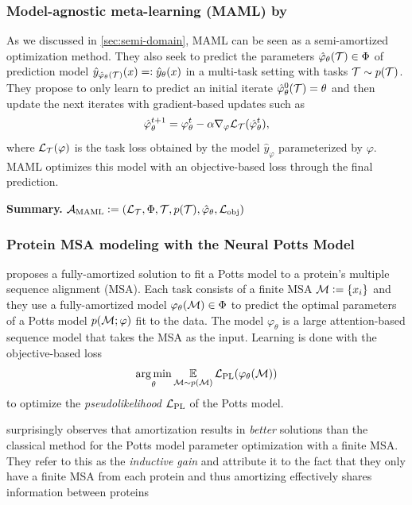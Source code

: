 \documentclass[twoside,11pt]{article}
\begin{document}
\subsubsection{Model-agnostic meta-learning (MAML) by \citet{finn2017model}}
As we discussed in \cref{sec:semi-domain},
MAML can be seen as a semi-amortized optimization method.
They also seek to predict the parameters
$\hat \varphi_\theta({\mathcal{T}})\in\Phi$
of prediction model $\hat y_{\hat \varphi_\theta({\mathcal{T}})}(x)=\vcentcolon \hat y_\theta(x)$
in a multi-task setting with tasks ${\mathcal{T}}\sim p({\mathcal{T}})$.
They propose to only learn to predict
an initial iterate $\hat \varphi^0_\theta({\mathcal{T}})=\theta$ and then
update the next iterates with gradient-based updates such as
\begin{equation}
  \hat \varphi^{t+1}_\theta = \varphi^t_\theta - \alpha\nabla_\varphi {\mathcal{L}}_{\mathcal{T}}(\hat \varphi^t_\theta),
  \label{eq:MAML-model}
\end{equation}
where ${\mathcal{L}}_{\mathcal{T}}(\varphi)$ is the task loss obtained by
the model $\hat y_\varphi$ parameterized by $\varphi$.
MAML optimizes this model with an objective-based
loss through the final prediction.

\textbf{Summary.}
${\mathcal{A}}_{\rm MAML}\vcentcolon=({\mathcal{L}}_{\mathcal{T}}, \Phi, {\mathcal{T}}, p({\mathcal{T}}), \hat \varphi_\theta, {\mathcal{L}}_{\rm obj})$

\subsubsection{Protein MSA modeling with the Neural Potts Model}
\label{sec:apps:potts}
\citet{sercu2021neural} proposes a fully-amortized solution to
fit a Potts model to a protein's multiple sequence alignment (MSA).
Each task consists of a finite MSA ${\mathcal{M}}\vcentcolon=\{x_i\}$
and they use a fully-amortized model $\varphi_\theta({\mathcal{M}})\in\Phi$
to predict the optimal parameters of a Potts model
$p({\mathcal{M}}; \varphi)$ fit to the data.
The model $\varphi_\theta$ is a large attention-based sequence
model that takes the MSA as the input.
Learning is done with the objective-based loss
\begin{equation}
  \operatorname*{arg\,min}_\theta \operatorname*{\mathbb{E}}_{{\mathcal{M}}\sim p({\mathcal{M}})} {\mathcal{L}}_{\rm PL}(\varphi_\theta({\mathcal{M}}))
  \label{eq:neural-potts-loss}
\end{equation}
to optimize the \emph{pseudolikelihood} ${\mathcal{L}}_{\rm PL}$ of
the Potts model.

\citet{sercu2021neural} surprisingly observes that amortization results
in \emph{better} solutions than the classical method
for the Potts model parameter optimization with a finite MSA.
They refer to this as the \emph{inductive gain} and attribute
it to the fact that they only have a finite MSA from each
protein and thus amortizing effectively shares information
between proteins
\end{document}
